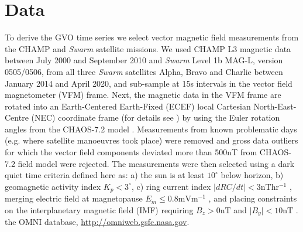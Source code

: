 \documentclass[extra,mreferee]{gji}
\begin{document}
\section{Data}
\label{sec:3}
To derive the GVO time series we select vector magnetic field measurements from the CHAMP and {\it Swarm} satellite missions. We used CHAMP L3 magnetic data between July 2000 and September 2010 and {\it Swarm} Level 1b MAG-L, version 0505/0506, from all three {\it Swarm} satellites Alpha, Bravo and Charlie between January 2014 and April 2020, and sub-sample at 15s intervals  in the vector field magnetometer (VFM) frame. Next, the magnetic data in the VFM frame are rotated into an Earth-Centered Earth-Fixed (ECEF) local Cartesian North-East-Centre (NEC) coordinate frame (for details see \cite{Olsen_etal_2006}) by using the Euler rotation angles from the CHAOS-7.2 model \citep{Finlay_etal_2020}. Measurements from known problematic days (e.g. where satellite manoeuvres took place) were removed and gross data outliers for which the vector field components deviated more than 500nT from CHAOS-7.2 field model  \cite{Finlay_etal_2020}  were rejected. The measurements were then selected using a dark quiet time criteria defined here as: a) the sun is at least $10^{\circ}$ below horizon, b) geomagnetic activity index $K_p < 3^{\circ}$, c) ring current index $\vert dRC/dt \vert < 3 \mathrm{nT hr^{-1}}$ \citep{Olsen_etal_2014}, merging electric field  at magnetopause $E_m \leq 0.8 \mathrm{mV m^{-1}}$ \citep{Olsen_etal_2014}, and placing constraints on the interplanetary magnetic field (IMF)  requiring $B_z > 0\mathrm{nT}$ and $\vert B_y \vert <10 \mathrm{nT}$ \citep{Ritter_etal_2004}.    the OMNI database, \url{http://omniweb.gsfc.nasa.gov}.
\end{document}
